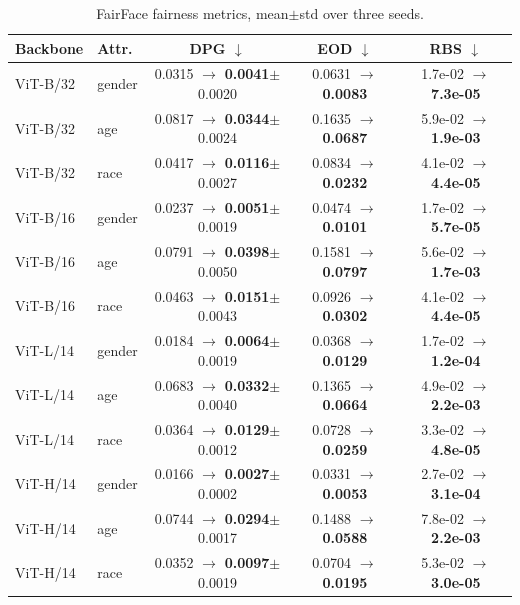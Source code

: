 \begin{table}[t]\centering\small
\caption{FairFace fairness metrics, mean$\pm$std over three seeds.}
\begin{tabular}{llccc}\toprule
Backbone & Attr. & DPG $\downarrow$ & EOD $\downarrow$ & RBS $\downarrow$\\\midrule
ViT-B/32 & gender & 0.0315 $\to$ \textbf{0.0041}$\pm$0.0020 & 0.0631 $\to$ \textbf{0.0083} & 1.7e-02 $\to$ \textbf{7.3e-05}\\
ViT-B/32 & age & 0.0817 $\to$ \textbf{0.0344}$\pm$0.0024 & 0.1635 $\to$ \textbf{0.0687} & 5.9e-02 $\to$ \textbf{1.9e-03}\\
ViT-B/32 & race & 0.0417 $\to$ \textbf{0.0116}$\pm$0.0027 & 0.0834 $\to$ \textbf{0.0232} & 4.1e-02 $\to$ \textbf{4.4e-05}\\
ViT-B/16 & gender & 0.0237 $\to$ \textbf{0.0051}$\pm$0.0019 & 0.0474 $\to$ \textbf{0.0101} & 1.7e-02 $\to$ \textbf{5.7e-05}\\
ViT-B/16 & age & 0.0791 $\to$ \textbf{0.0398}$\pm$0.0050 & 0.1581 $\to$ \textbf{0.0797} & 5.6e-02 $\to$ \textbf{1.7e-03}\\
ViT-B/16 & race & 0.0463 $\to$ \textbf{0.0151}$\pm$0.0043 & 0.0926 $\to$ \textbf{0.0302} & 4.1e-02 $\to$ \textbf{4.4e-05}\\
ViT-L/14 & gender & 0.0184 $\to$ \textbf{0.0064}$\pm$0.0019 & 0.0368 $\to$ \textbf{0.0129} & 1.7e-02 $\to$ \textbf{1.2e-04}\\
ViT-L/14 & age & 0.0683 $\to$ \textbf{0.0332}$\pm$0.0040 & 0.1365 $\to$ \textbf{0.0664} & 4.9e-02 $\to$ \textbf{2.2e-03}\\
ViT-L/14 & race & 0.0364 $\to$ \textbf{0.0129}$\pm$0.0012 & 0.0728 $\to$ \textbf{0.0259} & 3.3e-02 $\to$ \textbf{4.8e-05}\\
ViT-H/14 & gender & 0.0166 $\to$ \textbf{0.0027}$\pm$0.0002 & 0.0331 $\to$ \textbf{0.0053} & 2.7e-02 $\to$ \textbf{3.1e-04}\\
ViT-H/14 & age & 0.0744 $\to$ \textbf{0.0294}$\pm$0.0017 & 0.1488 $\to$ \textbf{0.0588} & 7.8e-02 $\to$ \textbf{2.2e-03}\\
ViT-H/14 & race & 0.0352 $\to$ \textbf{0.0097}$\pm$0.0019 & 0.0704 $\to$ \textbf{0.0195} & 5.3e-02 $\to$ \textbf{3.0e-05}\\
\bottomrule\end{tabular}\end{table}